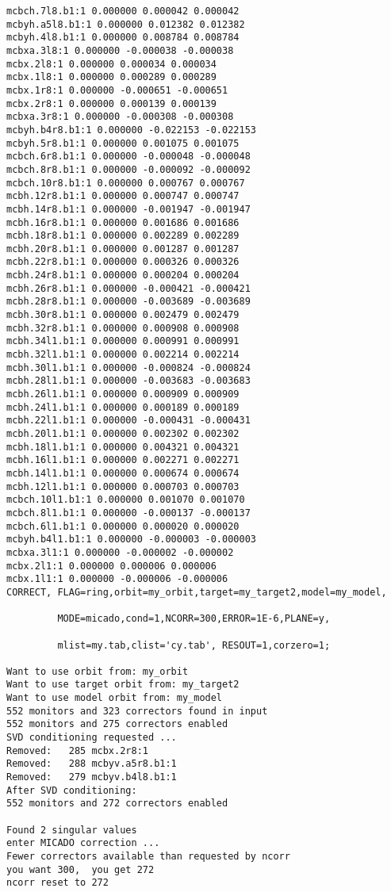 \begin{verbatim}
mcbch.7l8.b1:1 0.000000 0.000042 0.000042
mcbyh.a5l8.b1:1 0.000000 0.012382 0.012382
mcbyh.4l8.b1:1 0.000000 0.008784 0.008784
mcbxa.3l8:1 0.000000 -0.000038 -0.000038
mcbx.2l8:1 0.000000 0.000034 0.000034
mcbx.1l8:1 0.000000 0.000289 0.000289
mcbx.1r8:1 0.000000 -0.000651 -0.000651
mcbx.2r8:1 0.000000 0.000139 0.000139
mcbxa.3r8:1 0.000000 -0.000308 -0.000308
mcbyh.b4r8.b1:1 0.000000 -0.022153 -0.022153
mcbyh.5r8.b1:1 0.000000 0.001075 0.001075
mcbch.6r8.b1:1 0.000000 -0.000048 -0.000048
mcbch.8r8.b1:1 0.000000 -0.000092 -0.000092
mcbch.10r8.b1:1 0.000000 0.000767 0.000767
mcbh.12r8.b1:1 0.000000 0.000747 0.000747
mcbh.14r8.b1:1 0.000000 -0.001947 -0.001947
mcbh.16r8.b1:1 0.000000 0.001686 0.001686
mcbh.18r8.b1:1 0.000000 0.002289 0.002289
mcbh.20r8.b1:1 0.000000 0.001287 0.001287
mcbh.22r8.b1:1 0.000000 0.000326 0.000326
mcbh.24r8.b1:1 0.000000 0.000204 0.000204
mcbh.26r8.b1:1 0.000000 -0.000421 -0.000421
mcbh.28r8.b1:1 0.000000 -0.003689 -0.003689
mcbh.30r8.b1:1 0.000000 0.002479 0.002479
mcbh.32r8.b1:1 0.000000 0.000908 0.000908
mcbh.34l1.b1:1 0.000000 0.000991 0.000991
mcbh.32l1.b1:1 0.000000 0.002214 0.002214
mcbh.30l1.b1:1 0.000000 -0.000824 -0.000824
mcbh.28l1.b1:1 0.000000 -0.003683 -0.003683
mcbh.26l1.b1:1 0.000000 0.000909 0.000909
mcbh.24l1.b1:1 0.000000 0.000189 0.000189
mcbh.22l1.b1:1 0.000000 -0.000431 -0.000431
mcbh.20l1.b1:1 0.000000 0.002302 0.002302
mcbh.18l1.b1:1 0.000000 0.004321 0.004321
mcbh.16l1.b1:1 0.000000 0.002271 0.002271
mcbh.14l1.b1:1 0.000000 0.000674 0.000674
mcbh.12l1.b1:1 0.000000 0.000703 0.000703
mcbch.10l1.b1:1 0.000000 0.001070 0.001070
mcbch.8l1.b1:1 0.000000 -0.000137 -0.000137
mcbch.6l1.b1:1 0.000000 0.000020 0.000020
mcbyh.b4l1.b1:1 0.000000 -0.000003 -0.000003
mcbxa.3l1:1 0.000000 -0.000002 -0.000002
mcbx.2l1:1 0.000000 0.000006 0.000006
mcbx.1l1:1 0.000000 -0.000006 -0.000006
CORRECT, FLAG=ring,orbit=my_orbit,target=my_target2,model=my_model,

         MODE=micado,cond=1,NCORR=300,ERROR=1E-6,PLANE=y,

         mlist=my.tab,clist='cy.tab', RESOUT=1,corzero=1;

Want to use orbit from: my_orbit
Want to use target orbit from: my_target2
Want to use model orbit from: my_model
552 monitors and 323 correctors found in input
552 monitors and 275 correctors enabled
SVD conditioning requested ...
Removed:   285 mcbx.2r8:1
Removed:   288 mcbyv.a5r8.b1:1
Removed:   279 mcbyv.b4l8.b1:1
After SVD conditioning:             
552 monitors and 272 correctors enabled

Found 2 singular values
enter MICADO correction ...
Fewer correctors available than requested by ncorr
you want 300,  you get 272
ncorr reset to 272
  

\end{verbatim}
